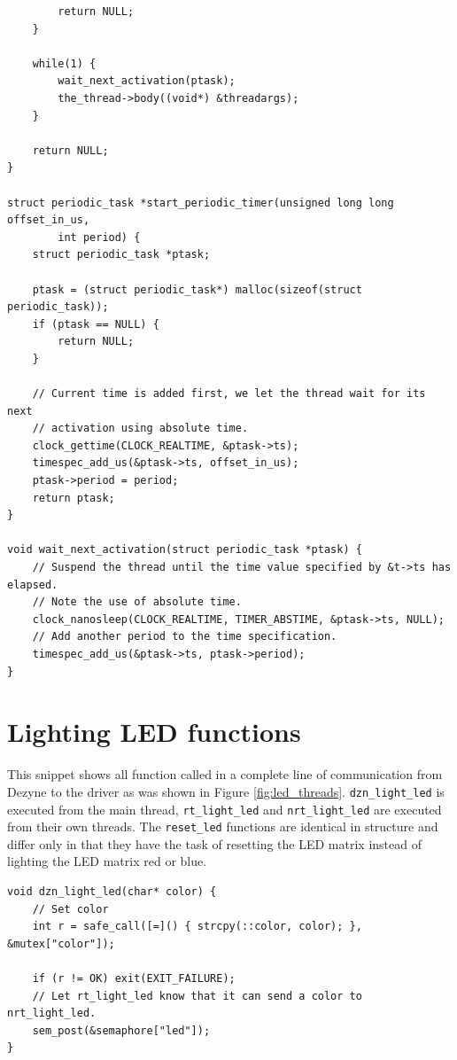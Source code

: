 \documentclass[12pt]{scrreprt}
\begin{document}
\begin{appendices}
\begin{verbatim}
        return NULL;
    }

    while(1) {
        wait_next_activation(ptask);
        the_thread->body((void*) &threadargs);
    }

    return NULL;
}

struct periodic_task *start_periodic_timer(unsigned long long offset_in_us,
        int period) {
    struct periodic_task *ptask;

    ptask = (struct periodic_task*) malloc(sizeof(struct periodic_task));
    if (ptask == NULL) {
        return NULL;
    }

    // Current time is added first, we let the thread wait for its next
    // activation using absolute time.
    clock_gettime(CLOCK_REALTIME, &ptask->ts);
    timespec_add_us(&ptask->ts, offset_in_us);
    ptask->period = period;
    return ptask;
}

void wait_next_activation(struct periodic_task *ptask) {
    // Suspend the thread until the time value specified by &t->ts has elapsed.
    // Note the use of absolute time.
    clock_nanosleep(CLOCK_REALTIME, TIMER_ABSTIME, &ptask->ts, NULL);
    // Add another period to the time specification.
    timespec_add_us(&ptask->ts, ptask->period);
}

\end{verbatim}

\section{Lighting LED functions}
This snippet shows all function called in a complete line of communication from Dezyne to the driver as was shown in Figure \ref{fig:led_threads}. \texttt{dzn\_light\_led} is executed from the main thread, \texttt{rt\_light\_led} and \texttt{nrt\_light\_led} are executed from their own threads. The \texttt{reset\_led} functions are identical in structure and differ only in that they have the task of resetting the LED matrix instead of lighting the LED matrix red or blue.

\begin{verbatim}
void dzn_light_led(char* color) {
    // Set color
    int r = safe_call([=]() { strcpy(::color, color); }, &mutex["color"]);

    if (r != OK) exit(EXIT_FAILURE);
    // Let rt_light_led know that it can send a color to nrt_light_led.
    sem_post(&semaphore["led"]);
}



\end{verbatim}
\end{appendices}
\end{document}
